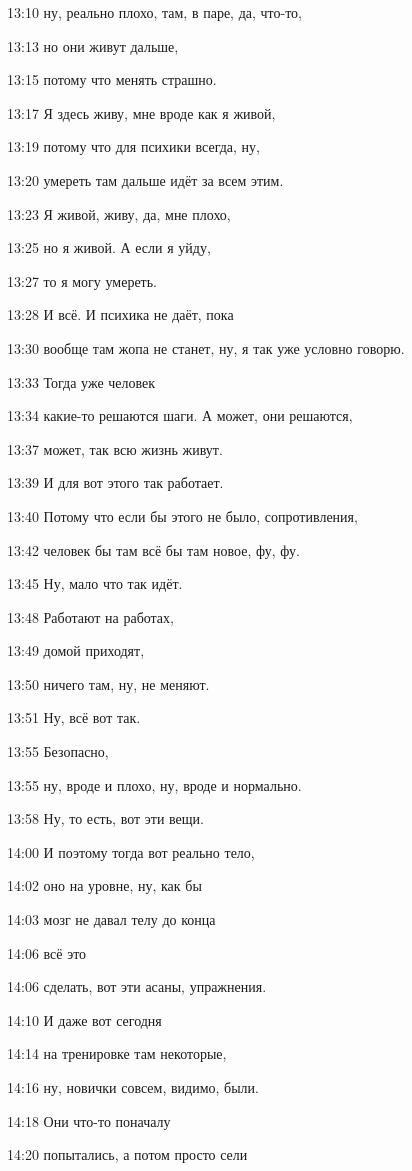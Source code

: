 13:10
ну, реально плохо, там, в паре, да, что-то,

13:13
но они живут дальше,

13:15
потому что менять страшно.

13:17
Я здесь живу, мне вроде как я живой,

13:19
потому что для психики всегда, ну,

13:20
умереть там дальше идёт за всем этим.

13:23
Я живой, живу, да, мне плохо,

13:25
но я живой. А если я уйду,

13:27
то я могу умереть.

13:28
И всё. И психика не даёт, пока

13:30
вообще там жопа не станет, ну, я так уже условно говорю.

13:33
Тогда уже человек

13:34
какие-то решаются шаги. А может, они решаются,

13:37
может, так всю жизнь живут.

13:39
И для вот этого так работает.

13:40
Потому что если бы этого не было, сопротивления,

13:42
человек бы там всё бы там новое, фу, фу.

13:45
Ну, мало что так идёт.

13:48
Работают на работах,

13:49
домой приходят,

13:50
ничего там, ну, не меняют.

13:51
Ну, всё вот так.

13:55
Безопасно,

13:55
ну, вроде и плохо, ну, вроде и нормально.

13:58
Ну, то есть, вот эти вещи.

14:00
И поэтому тогда вот реально тело,

14:02
оно на уровне, ну, как бы

14:03
мозг не давал телу до конца

14:06
всё это

14:06
сделать, вот эти асаны, упражнения.

14:10
И даже вот сегодня

14:14
на тренировке там некоторые,

14:16
ну, новички совсем, видимо, были.

14:18
Они что-то поначалу

14:20
попытались, а потом просто сели

